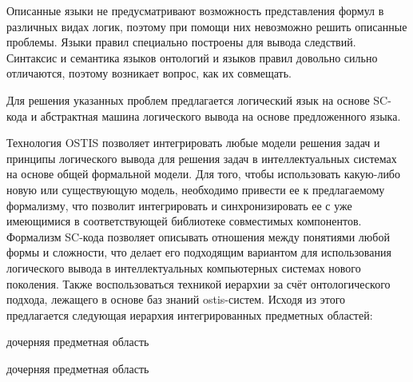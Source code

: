 Описанные языки не предусматривают возможность представления формул в различных видах логик, поэтому при помощи них невозможно решить описанные проблемы. Языки правил специально построены для вывода следствий. Синтаксис и семантика языков онтологий и языков правил довольно сильно отличаются, поэтому возникает вопрос, как их совмещать. 

Для решения указанных проблем предлагается логический язык на основе SC-кода и абстрактная машина логического вывода на основе предложенного языка. 

Технология OSTIS позволяет интегрировать любые модели решения задач и принципы логического вывода для решения задач в интеллектуальных системах на основе общей формальной модели. Для того, чтобы использовать какую-либо новую или существующую модель, необходимо привести ее к предлагаемому формализму, что позволит интегрировать и синхронизировать ее с уже имеющимися в соответствующей библиотеке совместимых компонентов. Формализм SC-кода позволяет описывать отношения между понятиями любой формы и сложности, что делает его подходящим вариантом для использования логического вывода в интеллектуальных компьютерных системах нового поколения. Также воспользоваться техникой иерархии за счёт онтологического подхода, лежащего в основе баз знаний ostis-систем. Исходя из этого предлагается следующая иерархия интегрированных предметных областей:

\begin{SCn}
	\begin{scnrelfromlist}{дочерняя предметная область}
	\end{scnrelfromlist}
	
	\begin{scnindent}
	\end{scnindent}
	
	\begin{scnreltolist}{дочерняя предметная область}
	\end{scnreltolist}
\end{SCn}

